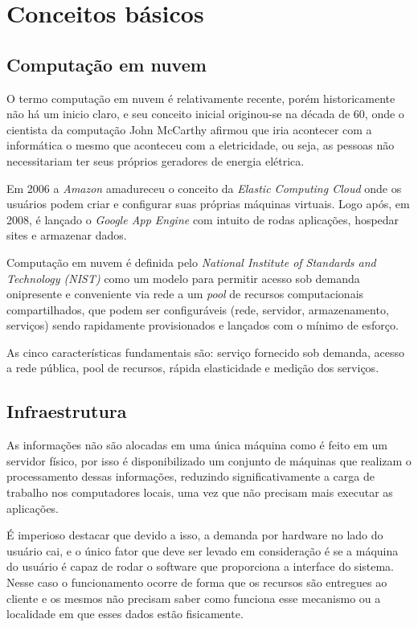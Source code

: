 \documentclass[12pt]{article}
\begin{document}
\section{Conceitos básicos}

\subsection{Computação em nuvem}

O termo computação em nuvem é relativamente recente, porém historicamente não há um inicio claro, e seu conceito inicial originou-se na década de 60, onde o cientista da computação John McCarthy afirmou que iria acontecer com a informática o mesmo que aconteceu com a eletricidade, ou seja, as pessoas não necessitariam ter seus próprios geradores de energia elétrica.

Em 2006 a \emph{Amazon} amadureceu o conceito da \emph{Elastic Computing Cloud} onde os usuários podem criar e configurar suas próprias máquinas virtuais. Logo após, em 2008, é lançado o \emph{Google App Engine} com intuito de rodas aplicações, hospedar sites e armazenar dados.

Computação em nuvem é definida pelo \emph{National Institute of Standards and Technology (NIST)} como um modelo para permitir acesso sob demanda onipresente e conveniente via rede a um \emph{pool} de recursos computacionais compartilhados, que podem ser configuráveis (rede, servidor, armazenamento, serviços) sendo rapidamente provisionados e lançados com o mínimo de esforço.

As cinco características fundamentais são: serviço fornecido sob demanda, acesso a rede pública, pool de recursos, rápida elasticidade e medição dos serviços.
\subsection{Infraestrutura}

As informações não são alocadas em uma única máquina como é feito em um servidor físico, por isso é disponibilizado um conjunto de máquinas que realizam o processamento dessas informações, reduzindo significativamente a carga de trabalho nos computadores locais, uma vez que não precisam mais executar as aplicações.

É imperioso destacar que devido a isso, a demanda por hardware no lado do usuário cai, e o único fator que deve ser levado em consideração é se a máquina do usuário é capaz de rodar o software que proporciona a interface do sistema. Nesse caso o funcionamento ocorre de forma que os recursos são entregues ao cliente e os mesmos não precisam saber como funciona esse mecanismo ou a localidade em que esses dados estão fisicamente.
\end{document}
